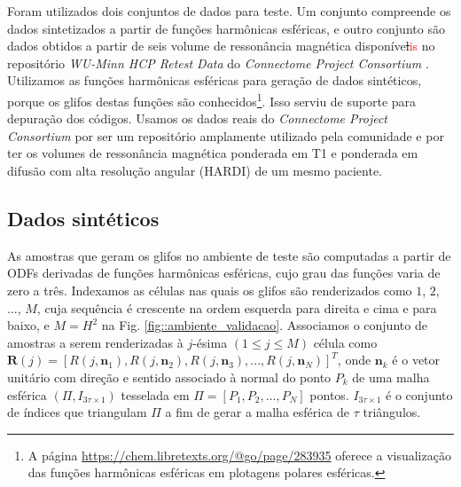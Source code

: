 

Foram utilizados dois conjuntos de dados para teste. Um conjunto compreende os dados sintetizados a partir de funções harmônicas esféricas, e outro conjunto são dados obtidos a partir de seis volume de ressonância magnética disponíve\sout{l}\textcolor{red}{is} no repositório \textit{WU-Minn HCP Retest Data} do \textit{Connectome Project Consortium} \cite{essen2012}. Utilizamos as funções harmônicas esféricas para geração de dados sintéticos, porque os glifos destas funções são conhecidos\footnote{A página \url{https://chem.libretexts.org/@go/page/283935} oferece a visualização das funções harmônicas esféricas em plotagens polares esféricas.}. Isso serviu de suporte para depuração dos códigos. Usamos os dados reais do \textit{Connectome Project Consortium} por ser um repositório amplamente utilizado pela comunidade e por ter os volumes de ressonância magnética ponderada em T1 e ponderada em difusão com alta resolução angular (HARDI) de um mesmo paciente.


\subsection{Dados sintéticos}
\label{sssec::dados_sinteticos}

 As amostras que geram os glifos no ambiente de teste são computadas a partir de ODFs derivadas de funções harmônicas esféricas, cujo grau das funções varia de zero a três. 
Indexamos as células nas quais os glifos são renderizados como $1$, $2$, ..., $M$, cuja sequência é crescente na ordem esquerda para direita e cima e para baixo, e $M = H^2$ na Fig. \ref{fig::ambiente_validacao}. Associamos o conjunto de amostras a serem renderizadas à $j$-ésima $(1 \leq j \leq M)$ célula como $\boldsymbol{R}(j) = [
R(j, \mathbf{n}_1), 
R(j, \mathbf{n}_2), 
R(j, \mathbf{n}_3), ..., 
R(j, \mathbf{n}_N)
]^T$, onde $\mathbf{n}_k$ é o vetor unitário com direção e sentido associado à normal do ponto $P_k$ de uma malha esférica $(\Pi, I_{3\tau \times 1})$ tesselada em $\Pi = [P_1, P_2, \dots, P_N]$ pontos. $I_{3\tau \times 1}$ é o conjunto de índices que triangulam $\Pi$ a fim de gerar a malha esférica de $\tau$ triângulos.%

